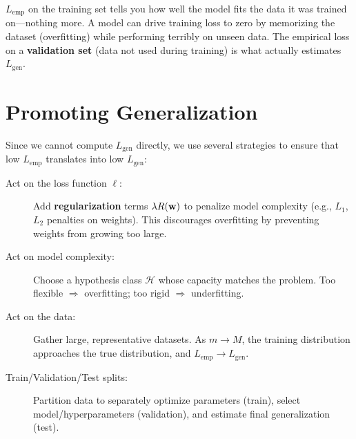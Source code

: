 \begin{remark}
$L_{\text{emp}}$ on the training set tells you how well the model fits the data it was trained on---nothing more. A model can drive training loss to zero by memorizing the dataset (overfitting) while performing terribly on unseen data. The empirical loss on a \textbf{validation set} (data not used during training) is what actually estimates $L_{\text{gen}}$.
\end{remark}

\section*{Promoting Generalization}

Since we cannot compute $L_{\text{gen}}$ directly, we use several strategies to ensure that low $L_{\text{emp}}$ translates into low $L_{\text{gen}}$:

\begin{description}
    \item[Act on the loss function $\ell$:] Add \textbf{regularization} terms $\lambda R(\mathbf{w})$ to penalize model complexity (e.g., $L_1$, $L_2$ penalties on weights). This discourages overfitting by preventing weights from growing too large.
    \item[Act on model complexity:] Choose a hypothesis class $\mathcal{H}$ whose capacity matches the problem. Too flexible $\Rightarrow$ overfitting; too rigid $\Rightarrow$ underfitting.
    \item[Act on the data:] Gather large, representative datasets. As $m \to M$, the training distribution approaches the true distribution, and $L_{\text{emp}} \to L_{\text{gen}}$.
    \item[Train/Validation/Test splits:] Partition data to separately optimize parameters (train), select model/hyperparameters (validation), and estimate final generalization (test).
\end{description}

